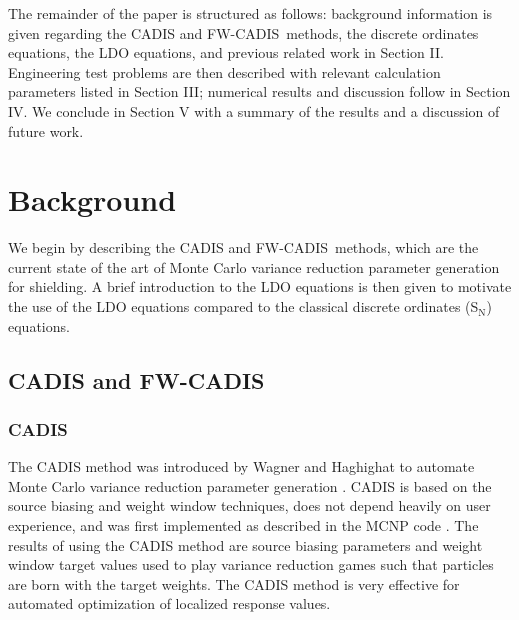\documentclass{article} %
\newcommand{\sn}{S$_\mathrm{N}$}
\newcommand{\fwc}{\mbox{FW-CADIS}}
\begin{document}
The remainder of the paper is structured as follows: background information is
given regarding the CADIS and \fwc\ methods, the discrete ordinates equations,
the LDO equations, and previous related work in Section II. Engineering test
problems are then described with relevant calculation parameters listed in
Section III; numerical results and discussion follow in Section IV. We
conclude in Section V with a summary of the results and a discussion of
future work.

\section{Background}
\label{sec:background}

We begin by describing the CADIS and \fwc\ methods, which are the current
state of the art of Monte Carlo variance reduction parameter generation for
shielding. A brief introduction to the LDO equations is then given to
motivate the use of the LDO equations compared to the classical
discrete ordinates (\sn) equations.

\subsection{CADIS and \fwc}

\subsubsection{CADIS}

The CADIS method was introduced by Wagner and Haghighat to automate Monte
Carlo variance reduction parameter generation \cite{cadis}. CADIS is based on
the source biasing and weight window techniques, does not depend heavily on
user experience, and was first implemented as described 
in the MCNP code \cite{cadis}. The results of using the CADIS method are
source biasing parameters and weight window target values used to play
variance reduction games such that particles are born with the target weights.
The CADIS method is very effective for automated optimization of localized
response values.
\end{document}
